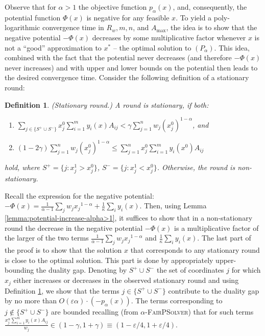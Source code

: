 \documentclass[11pt]{article}
\newcommand{\wratio}{R_w}
\newtheorem{definition}[theorem]{Definition}
\begin{document}
Observe that for $\alpha > 1$ the objective function $p_\alpha(x)$, and, consequently, the potential function $\Phi(x)$ is negative for any feasible $x$. To yield a poly-logarithmic convergence time in $\wratio, m, n$, and $A_{\max}$, the idea is to show that the negative potential $-\Phi(x)$ decreases by some multiplicative factor whenever $x$ is not a ``good'' approximation to $x^*$ -- the optimal solution to $(P_\alpha)$. This idea, combined with the fact that the potential never decreases (and therefore $-\Phi(x)$ never increases) and with upper and lower bounds on the potential then leads to the desired convergence time. 
Consider the following definition of a stationary round:
\begin{definition}\label{def:stationary-round}
(Stationary round.) A round is stationary, if both:
\begin{enumerate}[topsep = 5pt]
\item $\sum_{j\in\{S^+\cup S^-\}} x_j^0\sum_{i=1}^m y_i(x)A_{ij} < \gamma \sum_{j=1}^n w_j {(x_j^0)}^{1-\alpha}$, and
\item $(1-2\gamma)\sum_{j=1}^n w_j {(x_j^0)}^{1-\alpha}\leq \sum_{j=1}^n x_j^0\sum_{i=1}^m y_i(x^0)A_{ij}$
\end{enumerate}
hold, where $S^+ = \{j: x_j^1 > x_j^0\}$, $S^- = \{j: x_j^1 < x_j^0\}$. Otherwise, the round is non-stationary.
\end{definition}
Recall the expression for the negative potential: $-\Phi(x) = \frac{1}{\alpha - 1}\sum_jw_j{x_j}^{1-\alpha} + \frac{1}{\kappa}\sum_i y_i(x)$. Then, using Lemma \ref{lemma:potential-increase-alpha>1}, it suffices to show that in a non-stationary round the decrease in the negative potential $-\Phi(x)$ is a multiplicative factor of the larger of the two terms $\frac{1}{\alpha - 1}\sum_jw_j{x_j}^{1-\alpha}$ and $\frac{1}{\kappa}\sum_i y_i(x)$. 
The last part of the proof is to show that the solution $x$ that corresponds to any stationary round is close to the optimal solution. This part is done by appropriately upper-bounding the duality gap. Denoting by $S^+\cup S^-$ the set of coordinates $j$ for which $x_j$ either increases or decreases in the observed stationary round and using Definition \ref{def:stationary-round}, we show that the terms $j\in \{S^+ \cup S^-\}$ contribute to the duality gap by no more than $O(\varepsilon\alpha)\cdot (-p_\alpha(x))$. The terms corresponding to $j\notin \{S^+\cup S^-\}$ are bounded recalling (from \textsc{$\alpha$-FairPSolver}) that for such terms $\frac{x_j^\alpha \sum_{i=1}^m y_i(x)A_{ij}}{w_j}\in (1-\gamma, 1 + \gamma)\equiv(1-\varepsilon/4, 1+\varepsilon/4)$. 
\fi
\end{document}
